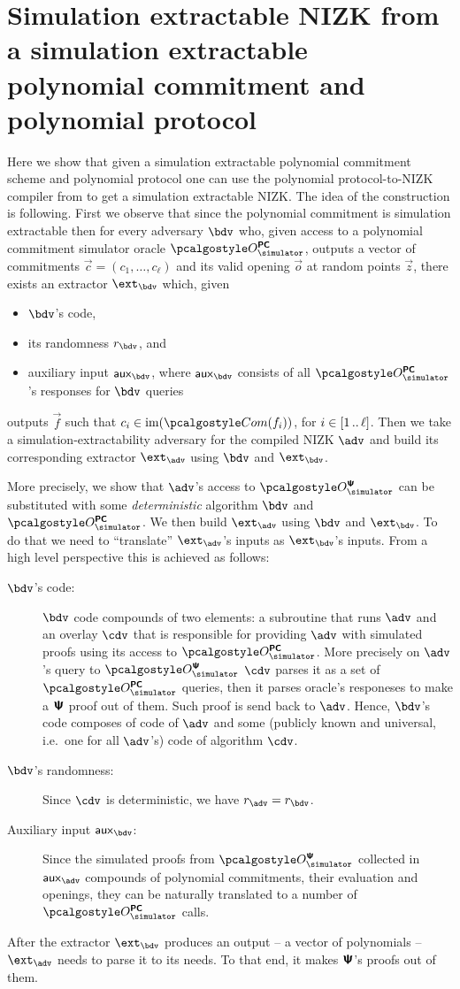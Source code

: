 \documentclass[runningheads,11pt]{llncs}
\begin{document}
\section{Simulation extractable NIZK from a simulation extractable polynomial
  commitment and polynomial protocol}
Here we show that given a simulation extractable polynomial commitment scheme
and polynomial protocol one can use the polynomial protocol-to-NIZK compiler
from \cite{EPRINT:GabWilCio19} to get a simulation extractable NIZK. The idea of
the construction is following. First we observe that since the polynomial
commitment is simulation extractable then for every adversary $\bdv$ who, given
access to a polynomial commitment simulator oracle $\oraclespcom$, outputs a
vector of commitments $\vec{c} = (c_1, \ldots, c_\ell)$ and its valid opening $\vec{o}$ at random points
$\vec{z}$, there exists an
extractor $\ext_\bdv$ which, given
\begin{itemize}
\item $\bdv$'s code,
\item its randomness $r_\bdv$, and
\item auxiliary input $\aux_\bdv$, where $\aux_\bdv$ consists of all
  $\oraclespcom$'s responses for $\bdv$ queries
\end{itemize}
outputs $\vec{f}$ such that $c_i \in \image(\com(f_i))$, for
$i \in [1 \, .. \, \ell]$.  Then we take a simulation-extractability adversary for
the compiled NIZK $\adv$ and build its corresponding extractor $\ext_\adv$ using
$\bdv$ and $\ext_\bdv$.

More precisely, we show that $\adv$'s access to $\oraclesps$ can be substituted
with some \emph{deterministic} algorithm $\bdv$ and $\oraclespcom$. We then
build $\ext_\adv$ using $\bdv$ and $\ext_\bdv$. To do that we need
to ``translate'' $\ext_\adv$'s inputs as $\ext_\bdv$'s inputs. From a high level
perspective this is achieved as follows:
\begin{description}
\item[$\bdv$'s code:] $\bdv$ code compounds of two elements: a subroutine that
  runs $\adv$ and an overlay $\cdv$ that is responsible for providing $\adv$ with
  simulated proofs using its access to $\oraclespcom$. More precisely on
  $\adv$'s query to $\oraclesps$ $\cdv$ parses it as a set of $\oraclespcom$
  queries, then it parses oracle's responeses to make a $\bm{\mathsf{\Psi}}$ proof out of
  them. Such proof is send back to $\adv$. Hence, $\bdv$'s code composes of code
  of $\adv$ and some (publicly known and universal, i.e.~one for all $\adv$'s)
  code of algorithm $\cdv$. 
\item[$\bdv$'s randomness:] Since $\cdv$ is deterministic, we have
  $r_\adv = r_\bdv$.
\item[Auxiliary input $\aux_\bdv$:] Since the simulated proofs from $\oraclesps$
  collected in $\aux_\adv$ compounds of polynomial commitments, their evaluation
  and openings, they can be naturally translated to a number of $\oraclespcom$
  calls.
\end{description}
After the extractor $\ext_\bdv$ produces an output -- a vector of polynomials --
$\ext_\adv$ needs to parse it to its needs. To that end, it makes $\bm{\mathsf{\Psi}}$'s proofs
out of them.
\end{document}
